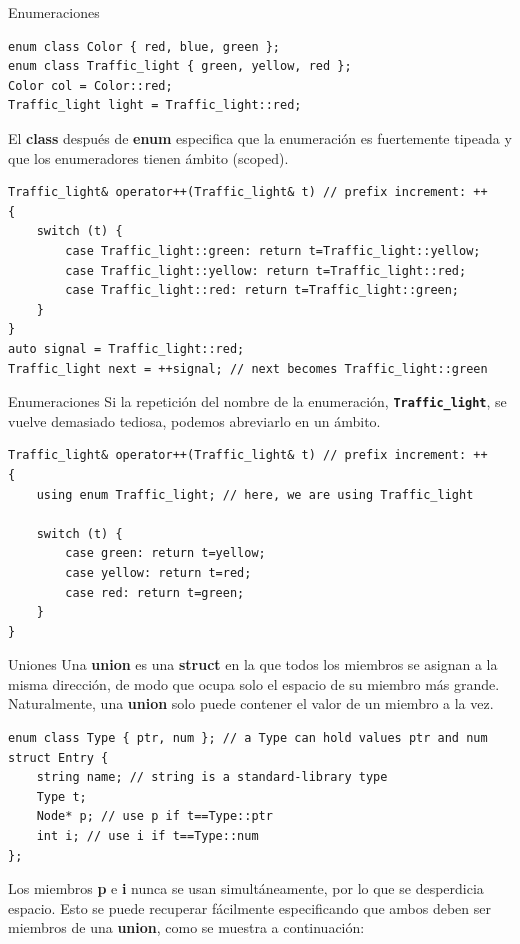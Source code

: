 \documentclass[11pt]{beamer}
\begin{document}
\begin{frame}[fragile]{Enumeraciones}
\begin{lstlisting}
enum class Color { red, blue, green };
enum class Traffic_light { green, yellow, red };
Color col = Color::red;
Traffic_light light = Traffic_light::red;
\end{lstlisting}
\vspace{0.4cm}	
\small	
El \textbf{class} después de \textbf{enum} especifica que la enumeración es fuertemente tipeada y que los enumeradores tienen ámbito (scoped).
\vspace{0.4cm}	

\begin{lstlisting}
Traffic_light& operator++(Traffic_light& t) // prefix increment: ++
{
	switch (t) {
		case Traffic_light::green: return t=Traffic_light::yellow;
		case Traffic_light::yellow: return t=Traffic_light::red;
		case Traffic_light::red: return t=Traffic_light::green;
	}
}
auto signal = Traffic_light::red;
Traffic_light next = ++signal; // next becomes Traffic_light::green
\end{lstlisting}
\end{frame}

\begin{frame}[fragile]{Enumeraciones}
	\small
Si la repetición del nombre de la enumeración, \textbf{\texttt{Traffic\_light}}, se vuelve demasiado tediosa, podemos abreviarlo en un ámbito.\newline	
\begin{lstlisting}
Traffic_light& operator++(Traffic_light& t) // prefix increment: ++
{
	using enum Traffic_light; // here, we are using Traffic_light
	
	switch (t) {
		case green: return t=yellow;
		case yellow: return t=red;
		case red: return t=green;
	}
}
\end{lstlisting}	
\end{frame}

\begin{frame}[fragile]{Uniones}
	\small
Una \textbf{union} es una \textbf{struct} en la que todos los miembros se asignan a la misma dirección, de modo que ocupa solo el espacio de su miembro más grande. Naturalmente, una \textbf{union} solo puede contener el valor de un miembro a la vez.\\
\vspace{0.4cm}
\begin{lstlisting}
enum class Type { ptr, num }; // a Type can hold values ptr and num
struct Entry {
	string name; // string is a standard-library type
	Type t;
	Node* p; // use p if t==Type::ptr
	int i; // use i if t==Type::num
};
\end{lstlisting}
\vspace{0.4cm}
Los miembros \textbf{p} e \textbf{i} nunca se usan simultáneamente, por lo que se desperdicia espacio. Esto se puede recuperar fácilmente especificando que ambos deben ser miembros de una \textbf{union}, como se muestra a continuación:

\end{frame}
\end{document}
